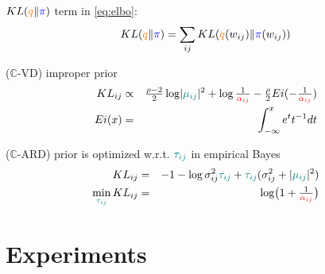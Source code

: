 \documentclass{beamer}
\newcommand{\real}{\mathbb{R}}
\newcommand{\cplx}{\mathbb{C}}
\begin{document}
\begin{frame}[c]{\insertsection}

  $\mathop{KL}({\color{orange} q} \| {\color{blue} \pi})$ term in \eqref{eq:elbo}:
  \begin{equation*}
    \mathop{KL}({\color{orange} q} \| {\color{blue} \pi})
      = \sum_{ij} \mathop{KL}({\color{orange} q}(w_{ij}) \| {\color{blue} \pi}(w_{ij}))
  \end{equation*}

  \pause
  \bigskip
  ($\cplx$-VD) improper prior
  \begin{eqnarray*}
    \mathop{KL}\nolimits_{ij}
      &\propto&
        \tfrac{\rho - 2}2 \log \lvert {\color{teal} \mu_{ij}} \rvert^2
        + \log \tfrac1{{\color{red} \alpha_{ij}}}
        - \tfrac\rho2 Ei( - \tfrac1{{\color{red} \alpha_{ij}}})
      \\
    Ei(x) &=& \int_{-\infty}^x e^t t^{-1} dt
  \end{eqnarray*}

  \pause
  \bigskip
  ($\cplx$-ARD) prior is optimized w.r.t. ${\color{teal} \tau_{ij}}$ in empirical Bayes
  \begin{eqnarray*}
    \mathop{KL}\nolimits_{ij}
      &=& -1
        - \log \sigma^2_{ij} {\color{teal} \tau_{ij}}
        + {\color{teal} \tau_{ij}} (\sigma^2_{ij} + \lvert {\color{teal} \mu_{ij}} \rvert^2)
      \\
    \min_{{\color{teal} \tau_{ij}}} \mathop{KL}\nolimits_{ij}
      &=& \log \bigl( 1 + \tfrac1{{\color{red} \alpha_{ij}}} \bigr)
  \end{eqnarray*}

\end{frame}



\section{Experiments} %
\label{sec:experiments}
\end{document}

